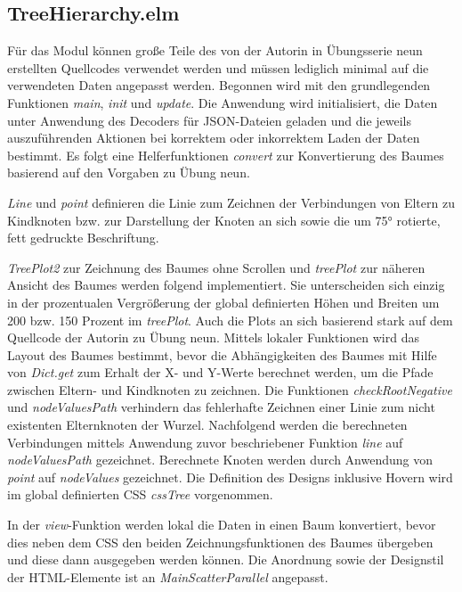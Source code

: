 \documentclass[usegeometry=true]{scrartcl}
\begin{document}
\subsection{TreeHierarchy.elm}
Für das Modul können große Teile des von der Autorin in Übungsserie neun erstellten Quellcodes verwendet werden und müssen lediglich minimal auf die verwendeten Daten angepasst werden. 
Begonnen wird mit den grundlegenden Funktionen \textit{main}, \textit{init} und \textit{update}. 
Die Anwendung wird initialisiert, die Daten unter Anwendung des Decoders für JSON-Dateien geladen und die jeweils auszuführenden Aktionen bei korrektem oder inkorrektem Laden der Daten bestimmt. 
Es folgt eine Helferfunktionen \textit{convert} zur Konvertierung des Baumes basierend auf den Vorgaben zu Übung neun.

\textit{Line} und \textit{point} definieren die Linie zum Zeichnen der Verbindungen von Eltern zu Kindknoten bzw. zur Darstellung der Knoten an sich sowie die um 75° rotierte, fett gedruckte Beschriftung. 

\textit{TreePlot2} zur Zeichnung des Baumes ohne Scrollen und \textit{treePlot} zur näheren Ansicht des Baumes werden folgend implementiert. 
Sie unterscheiden sich einzig in der prozentualen Vergrößerung der global definierten Höhen und Breiten um 200 bzw. 150 Prozent im \textit{treePlot}.
Auch die Plots an sich basierend stark auf dem Quellcode der Autorin zu Übung neun. 
Mittels lokaler Funktionen wird das Layout des Baumes bestimmt, bevor die Abhängigkeiten des Baumes mit Hilfe von \textit{Dict.get} zum Erhalt der X- und Y-Werte berechnet werden, um die Pfade zwischen Eltern- und Kindknoten zu zeichnen. 
Die Funktionen \textit{checkRootNegative} und \textit{nodeValuesPath} verhindern das fehlerhafte Zeichnen einer Linie zum nicht existenten Elternknoten der Wurzel.
Nachfolgend werden die berechneten Verbindungen mittels Anwendung zuvor beschriebener Funktion \textit{line} auf \textit{nodeValuesPath} gezeichnet.
Berechnete Knoten werden durch Anwendung von \textit{point} auf \textit{nodeValues} gezeichnet. 
Die Definition des Designs inklusive Hovern wird im global definierten CSS \textit{cssTree} vorgenommen. 

In der \textit{view}-Funktion werden lokal die Daten in einen Baum konvertiert, bevor dies neben dem CSS den beiden Zeichnungsfunktionen des Baumes übergeben und diese dann ausgegeben werden können.
Die Anordnung sowie der Designstil der HTML-Elemente ist an \textit{MainScatterParallel} angepasst. 
\end{document}

